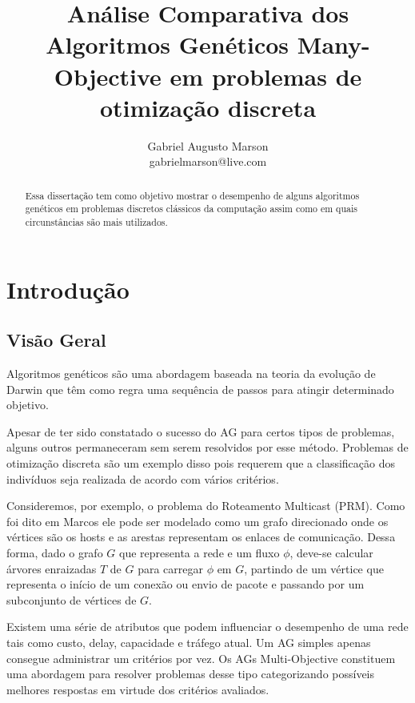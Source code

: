 \documentclass[]{article}
\title{Análise Comparativa dos Algoritmos Genéticos Many-Objective em problemas de otimização discreta}
\author{Gabriel Augusto Marson\\ gabrielmarson@live.com }
\begin{document}
\maketitle

\begin{abstract}
	
	\noindent Essa dissertação tem como objetivo mostrar o desempenho de alguns algoritmos genéticos em problemas discretos clássicos da computação assim como em quais circunstâncias são mais utilizados.
	
\end{abstract}

\section{Introdução}

\subsection{Visão Geral}	

	Algoritmos genéticos são uma abordagem baseada na teoria da evolução de Darwin que têm como regra uma sequência de passos para atingir determinado objetivo. 
	
	Apesar de ter sido constatado o sucesso do AG para certos tipos de problemas, alguns outros permaneceram sem serem resolvidos por esse método. Problemas de otimização discreta são um exemplo disso pois requerem que a classificação dos indivíduos seja realizada de acordo com vários critérios.
		
	Consideremos, por exemplo, o problema do Roteamento Multicast (PRM). Como foi dito em Marcos \cite{bueno2010heuristicas} ele pode ser modelado como um grafo direcionado onde os vértices são os hosts e as arestas representam os enlaces de comunicação. Dessa forma, dado o grafo $G$ que representa a rede e um fluxo $\phi$, deve-se calcular árvores enraizadas $T$ de $G$ para carregar $\phi$ em $G$, partindo de um vértice que representa o início de um conexão ou envio de pacote e passando por um subconjunto de vértices de $G$.
	
	Existem uma série de atributos que podem influenciar o desempenho de uma rede tais como custo, delay, capacidade e tráfego atual. Um AG simples apenas consegue administrar um critérios por vez. Os AGs Multi-Objective constituem uma abordagem para resolver problemas desse tipo categorizando possíveis melhores respostas em virtude dos critérios avaliados.
	
\end{document}
